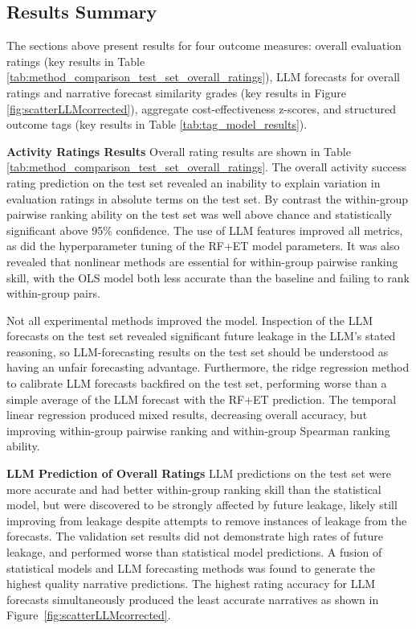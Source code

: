 \documentclass[12pt,a4paper]{article}
\begin{document}
\subsection{Results Summary} \label{sub:results_summary}
The sections above present results for four outcome measures: overall evaluation ratings (key results in Table \ref{tab:method_comparison_test_set_overall_ratings}), LLM forecasts for overall ratings and narrative forecast similarity grades (key results in Figure \ref{fig:scatterLLMcorrected}), aggregate cost-effectiveness z-scores, and structured outcome tags (key results in Table \ref{tab:tag_model_results}). 

\textbf{Activity Ratings Results}
Overall rating results are shown in Table \ref{tab:method_comparison_test_set_overall_ratings}. The overall activity success rating prediction on the test set revealed an inability to explain variation in evaluation ratings in absolute terms on the test set. By contrast the within-group pairwise ranking ability on the test set was well above chance and statistically significant above 95\% confidence. The use of LLM features improved all metrics, as did the hyperparameter tuning of the RF+ET model parameters. It was also revealed that nonlinear methods are essential for within-group pairwise ranking skill, with the OLS model both less accurate than the baseline and failing to rank within-group pairs. 

Not all experimental methods improved the model. Inspection of the LLM forecasts on the test set revealed significant future leakage in the LLM's stated reasoning, so LLM-forecasting results on the test set should be understood as having an unfair forecasting advantage. Furthermore, the ridge regression method to calibrate LLM forecasts backfired on the test set, performing worse than a simple average of the LLM forecast with the RF+ET prediction. The temporal linear regression produced mixed results, decreasing overall accuracy, but improving within-group pairwise ranking and within-group Spearman ranking ability.

\textbf{LLM Prediction of Overall Ratings}
LLM predictions on the test set were more accurate and had better within-group ranking skill than the statistical model, but were discovered to be strongly affected by future leakage, likely still improving from leakage despite attempts to remove instances of leakage from the forecasts. The validation set results did not demonstrate high rates of future leakage, and performed worse than statistical model predictions. A fusion of statistical models and LLM forecasting methods was found to generate the highest quality narrative predictions. The highest rating accuracy for LLM forecasts simultaneously produced the least accurate narratives as shown in Figure~\ref{fig:scatterLLMcorrected}.
\end{document}
